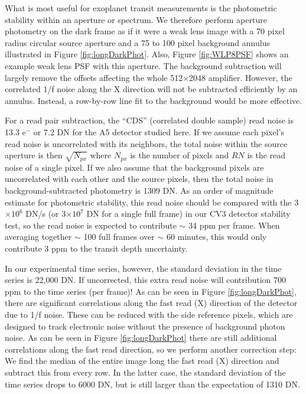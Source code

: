 \documentclass{aastex62}
\begin{document}
What is most useful for exoplanet transit measurements is the photometric stability within an aperture or spectrum.
We therefore perform aperture photometry on the dark frame as if it were a weak lens image with a 70 pixel radius circular source aperture and a 75 to 100 pixel background annulus illustrated in Figure \ref{fig:longDarkPhot}.
Also, Figure \ref{fig:WLP8PSF} shows an example weak lens PSF with this aperture.
The background subtraction will largely remove the offsets affecting the whole 512$\times$2048 amplifier.
However, the correlated 1/f noise along the X direction will not be subtracted efficiently by an annulus.
Instead, a row-by-row line fit to the background would be more effective.

For a read pair subtraction, the ``CDS'' (correlated double sample) read noise is 13.3 e$^-$ or 7.2 DN for the A5 detector studied here.
If we assume each pixel's read noise is uncorrelated with its neighbors, the total noise within the source aperture is then $\sqrt{N_{px}}$ where $N_{px}$ is the number of pixels and $RN$ is the read noise of a single pixel.
If we also assume that the background pixels are uncorrelated with each other and the source pixels, then the total noise in background-subtracted photometry is 1309 DN.
As an order of magnitude estimate for photometric stability, this read noise should be compared with the 3$\times 10^{6}$ DN/s (or 3$\times 10^7$ DN for a single full frame) in our CV3 detector stability test, so the read noise is expected to contribute $\sim$ 34 ppm per frame.
When averaging together $\sim$ 100 full frames over $\sim$ 60 minutes, this would only contribute 3 ppm to the transit depth uncertainty.

In our experimental time series, however, the standard deviation in the time series is 22,000 DN.
If uncorrected, this extra read noise will contribution 700 ppm to the time series (per frame)!
As can be seen in Figure \ref{fig:longDarkPhot}, there are significant correlations along the fast read (X) direction of the detector due to 1/f noise.
These can be reduced with the side reference pixels, which are designed to track electronic noise without the presence of background photon noise.
As can be seen in Figure \ref{fig:longDarkPhot} there are still additional correlations along the fast read direction, so we perform another correction step:
We find the median of the entire image long the fast read (X) direction and subtract this from every row.
In the latter case, the standard deviation of the time series drops to 6000 DN, but is still larger than the expectation of 1310 DN.
\end{document}
